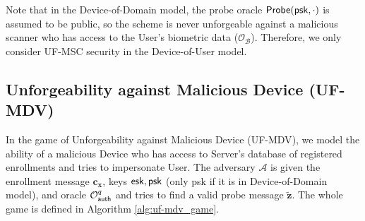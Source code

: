 Note that in the Device-of-Domain model, the probe oracle ${\sf Probe}({\sf psk}, \cdot)$ is assumed to be public, so the scheme is never unforgeable against a malicious scanner who has access to the {\sf User}'s biometric data ($\mathcal{O}_{\mathcal{B}}$). Therefore, we only consider \textsf{UF-MSC} security in the Device-of-User model. 



\subsection{Unforgeability against Malicious Device (\textsf{UF-MDV})}
\label{sec:uf-mdv_game}

In the game of Unforgeability against Malicious Device (\textsf{UF-MDV}), we model the ability of a malicious {\sf Device} who has access to {\sf Server}'s database of registered enrollments and tries to impersonate {\sf User}. The adversary $\mathcal{A}$ is given the enrollment message $\mathbf{c_x}$, keys ${\sf esk}, {\sf psk}$ (only {\sf psk} if it is in Device-of-Domain model), and oracle $\mathcal{O}_{\sf auth}^q$ and tries to find a valid probe message $\mathbf{\tilde{z}}$. The whole game is defined in Algorithm \ref{alg:uf-mdv_game}.


